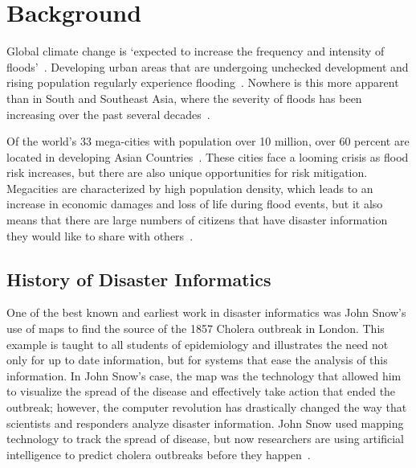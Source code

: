 \chapter{Background}

Global climate change is `expected to increase the frequency and intensity of
floods'~\cite{ahernGlobalHealthImpacts2005}. Developing urban areas that are
undergoing unchecked development and rising population regularly experience
flooding~\cite{chanFloodRiskAsia2012}.  Nowhere is this more apparent than
in South and Southeast Asia, where the severity of floods has been increasing
over the past several decades~\cite{tortiFloodsSoutheastAsia2012}.

Of the world's 33 mega-cities with population over 10 million, over 60 percent
are located in developing Asian
Countries~\cite{unitednationsdepartmentofeconomicandsocialaffairsWorldCities20162016}.
These cities face a looming crisis as flood risk increases, but there are also
unique opportunities for risk mitigation. Megacities are characterized by high
population density, which leads to an increase in economic damages and loss of
life during flood events, but it also means that there are large numbers of
citizens that have disaster information they would like to share with
others~\cite{chanFloodRiskAsia2012}.

\section{History of Disaster Informatics} One of the best known and earliest
work in disaster informatics was John Snow's use of maps to find the source of
the 1857 Cholera outbreak in London\cite{rogersJohnSnowData2013}. This example
is taught to all students of epidemiology and illustrates the need
not only for up to date information, but for systems that ease the
analysis of this information. In John Snow's case, the map was the technology
that allowed him to visualize the spread of the disease and effectively take
action that ended the outbreak; however, the computer revolution has drastically
changed the way that scientists and responders analyze disaster information.
John Snow used mapping technology to track the spread of disease, but now
researchers are using artificial intelligence to predict cholera outbreaks
before they happen~\cite{radinskyMiningWebPredict2013}.

